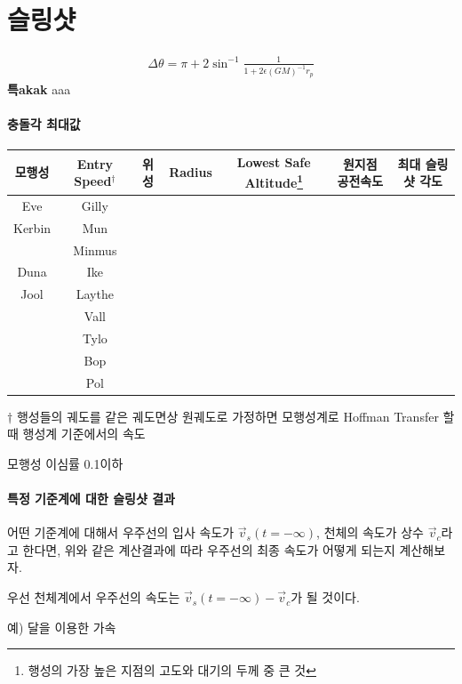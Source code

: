 \documentclass[9pt]{amsbook}
\begin{document}
\section{슬링샷}

\begin{align}
	\Delta \theta = \pi + 2\sin^{-1}\frac{1}{{1+2\epsilon (GM)^{-1}r_p}}
\end{align}
\textbf{\textsf{\large 특akak}}\;\; aaa

\paragraph{충돌각 최대값}
\begin{center}
\begin{threeparttable}
\begin{tabular}{|c|c|c|c|c|c|c|}
모행성&Entry Speed$^\dagger$& 위성& Radius& Lowest Safe Altitude\footnote{행성의 가장 높은 지점의 고도와 대기의 두께 중 큰 것}&원지점 공전속도 &최대 슬링샷 각도
\\\hline
Eve&Gilly
\\\hline
Kerbin&Mun
\\&Minmus
\\\hline
Duna&Ike
\\\hline
Jool&Laythe
\\&Vall
\\&Tylo
\\&Bop
\\&Pol
\end{tabular}
\begin{tablenotes}
\item[$\dagger$] 행성들의 궤도를 같은 궤도면상 원궤도로 가정하면 모행성계로 Hoffman Transfer 할 때 행성계 기준에서의 속도
\end{tablenotes}
\end{threeparttable}
\end{center}
모행성 이심률 0.1이하
\paragraph{특정 기준계에 대한 슬링샷 결과}
어떤 기준계에 대해서 우주선의 입사 속도가 $\vec{v}_s(t=-\infty)$, 천체의 속도가 상수 $\vec{v}_c$라고 한다면, 위와 같은 계산결과에 따라 우주선의 최종 속도가 어떻게 되는지 계산해보자.

우선 천체계에서 우주선의 속도는 $\vec{v}_s(t=-\infty)-\vec{v}_c$가 될 것이다.

예) 달을 이용한 가속
\end{document}
